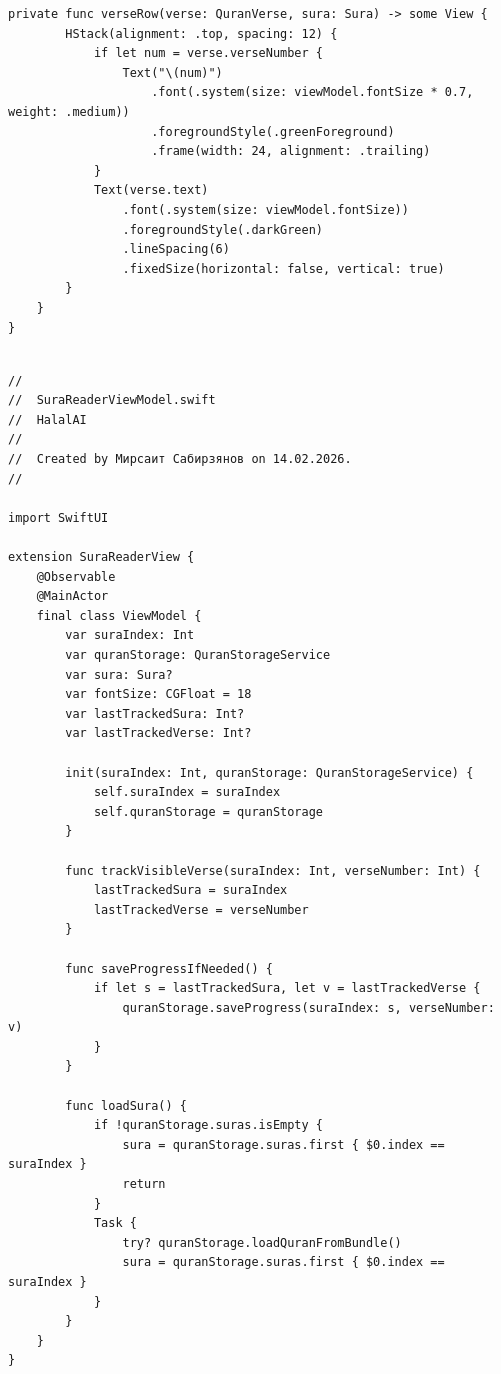 \begin{lstlisting}[basicstyle=\tiny\ttfamily,breaklines=true]
    private func verseRow(verse: QuranVerse, sura: Sura) -> some View {
        HStack(alignment: .top, spacing: 12) {
            if let num = verse.verseNumber {
                Text("\(num)")
                    .font(.system(size: viewModel.fontSize * 0.7, weight: .medium))
                    .foregroundStyle(.greenForeground)
                    .frame(width: 24, alignment: .trailing)
            }
            Text(verse.text)
                .font(.system(size: viewModel.fontSize))
                .foregroundStyle(.darkGreen)
                .lineSpacing(6)
                .fixedSize(horizontal: false, vertical: true)
        }
    }
}
\end{lstlisting}

\begin{lstlisting}[basicstyle=\tiny\ttfamily,breaklines=true]

//
//  SuraReaderViewModel.swift
//  HalalAI
//
//  Created by Мирсаит Сабирзянов on 14.02.2026.
//

import SwiftUI

extension SuraReaderView {
    @Observable
    @MainActor
    final class ViewModel {
        var suraIndex: Int
        var quranStorage: QuranStorageService
        var sura: Sura?
        var fontSize: CGFloat = 18
        var lastTrackedSura: Int?
        var lastTrackedVerse: Int?
        
        init(suraIndex: Int, quranStorage: QuranStorageService) {
            self.suraIndex = suraIndex
            self.quranStorage = quranStorage
        }
        
        func trackVisibleVerse(suraIndex: Int, verseNumber: Int) {
            lastTrackedSura = suraIndex
            lastTrackedVerse = verseNumber
        }

        func saveProgressIfNeeded() {
            if let s = lastTrackedSura, let v = lastTrackedVerse {
                quranStorage.saveProgress(suraIndex: s, verseNumber: v)
            }
        }

        func loadSura() {
            if !quranStorage.suras.isEmpty {
                sura = quranStorage.suras.first { $0.index == suraIndex }
                return
            }
            Task {
                try? quranStorage.loadQuranFromBundle()
                sura = quranStorage.suras.first { $0.index == suraIndex }
            }
        }
    }
}
\end{lstlisting}

